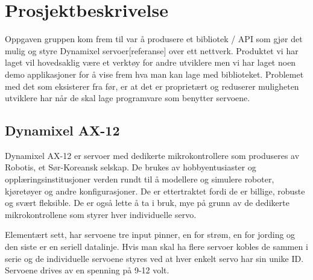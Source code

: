 \documentclass[12pt]{report}
\begin{document}
\section{Prosjektbeskrivelse}
Oppgaven gruppen kom frem til var å produsere et bibliotek / API som gjør det mulig og styre Dynamixel servoer[referanse] over ett nettverk. Produktet vi har laget vil hovedsaklig være et verktøy for andre utviklere men vi har laget noen demo applikasjoner for å vise frem hva man kan lage med biblioteket. Problemet med det som eksisterer fra før, er at det er proprietært og reduserer muligheten utviklere har når de skal lage programvare som benytter servoene.

\subsection{Dynamixel AX-12}
Dynamixel AX-12 er servoer med dedikerte mikrokontrollere som produseres av Robotis, et Sør-Koreansk selskap. De brukes av hobbyentusiaster og opplæringsinstitusjoner verden rundt til å modellere og simulere roboter, kjøretøyer og andre konfigurasjoner. De er ettertraktet fordi de er billige, robuste og svært fleksible. De er også lette å ta i bruk, mye på grunn av de dedikerte mikrokontrollene som styrer hver individuelle servo.

Elementært sett, har servoene tre input pinner, en for strøm, en for jording og den siste er en seriell datalinje. Hvis man skal ha flere servoer kobles de sammen i serie og de individuelle servoene styres ved at hver enkelt servo har sin unike ID. Servoene drives av en spenning på 9-12 volt.
\end{document}
